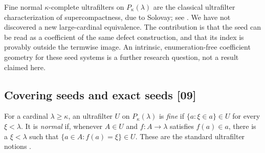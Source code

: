 \documentclass[11pt,letterpaper]{article}
\numberwithin{equation}{section}
\theoremstyle{definition}
\theoremstyle{remark}
\newcommand{\src}[1]{\textup{\textsf{\small[#1]}}}%
\begin{document}
Fine normal $\kappa$-complete ultrafilters on $P_\kappa(\lambda)$ are the
classical ultrafilter characterization of supercompactness, due to Solovay;
see \cite{Neeman}. We have not discovered a new large-cardinal equivalence.
The contribution is that the seed can be read as a coefficient of the
same defect construction, and that its index is provably outside the
termwise image. An intrinsic, enumeration-free coefficient geometry for
these seed systems is a further research question, not a result claimed
here.

\subsection{Covering seeds and exact seeds \src{09}}
For a cardinal $\lambda\ge\kappa$, an ultrafilter $U$ on $P_\kappa(\lambda)$ is
\emph{fine} if $\{a:\xi\in a\}\in U$ for every $\xi<\lambda$. It is
\emph{normal} if, whenever $A\in U$ and $f:A\to\lambda$ satisfies
$f(a)\in a$, there is a $\xi<\lambda$ such that $\{a\in A:f(a)=\xi\}\in U$.
These are the standard ultrafilter notions \cite{Kanamori,Reflecting}.
\end{document}
